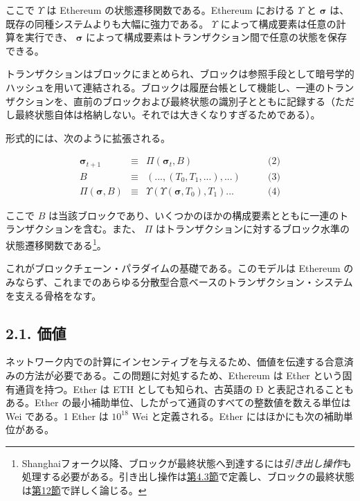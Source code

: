 \documentclass[
]{ltjsarticle}
\begin{document}
ここで \(\Upsilon\) は Ethereum の状態遷移関数である。Ethereum における
\(\Upsilon\) と \(\boldsymbol{\sigma}\)
は、既存の同種システムよりも大幅に強力である。 \(\Upsilon\)
によって構成要素は任意の計算を実行でき、 \(\boldsymbol{\sigma}\)
によって構成要素はトランザクション間で任意の状態を保存できる。

トランザクションはブロックにまとめられ、ブロックは参照手段として暗号学的ハッシュを用いて連結される。ブロックは履歴台帳として機能し、一連のトランザクションを、直前のブロックおよび最終状態の識別子とともに記録する（ただし最終状態自体は格納しない。それでは大きくなりすぎるためである）。

形式的には、次のように拡張される。

\protect\hypertarget{eq-2}{}{}\protect\hypertarget{eq-3}{}{}\protect\hypertarget{eq-4}{}{}

\[\begin{aligned}
\boldsymbol{\sigma}_{t+1} & \equiv & \Pi(\boldsymbol{\sigma}_{t}, B) & \qquad \text{(2)} \\
B & \equiv & (..., (T_0, T_1, ...), ...) & \qquad \text{(3)} \\
\Pi(\boldsymbol{\sigma}, B) & \equiv & \Upsilon(\Upsilon(\boldsymbol{\sigma}, T_0), T_1) ... & \qquad \text{(4)}
\end{aligned}\]

ここで \protect\hyperlink{block}{\(B\)}
は当該ブロックであり、いくつかのほかの構成要素とともに一連のトランザクションを含む。また、
\(\Pi\)
はトランザクションに対するブロック水準の状態遷移関数である\footnote{Shanghaiフォーク以降、ブロックが最終状態へ到達するには\emph{引き出し操作}も処理する必要がある。引き出し操作は\protect\hyperlink{subsec:The_Withdrawal}{第4.3節}で定義し、ブロックの最終状態は\protect\hyperlink{ch:finalisation}{第12節}で詳しく論じる。}。

これがブロックチェーン・パラダイムの基礎である。このモデルは Ethereum
のみならず、これまでのあらゆる分散型合意ベースのトランザクション・システムを支える骨格をなす。

\hypertarget{ux4fa1ux5024}{%
\subsection{2.1. 価値}\label{ux4fa1ux5024}}

ネットワーク内での計算にインセンティブを与えるため、価値を伝達する合意済みの方法が必要である。この問題に対処するため、Ethereum
は Ether という固有通貨を持つ。Ether は ETH としても知られ、古英語の Ð
と表記されることもある。Ether
の最小補助単位、したがって通貨のすべての整数値を数える単位は Wei
である。1 Ether は \(10^{18}\) Wei と定義される。Ether
にはほかにも次の補助単位がある。
\end{document}
